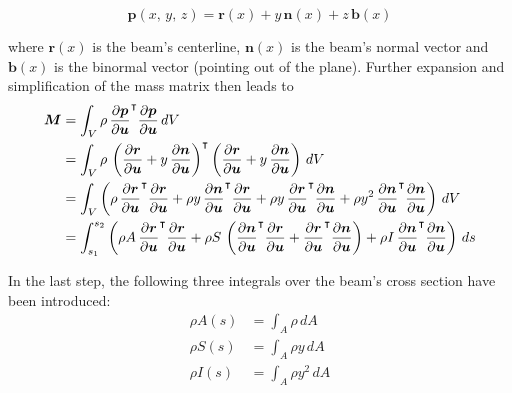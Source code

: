 \begin{equation}
\boldsymbol{p}(x,\,y,\,z) = \boldsymbol{r}(x) + y\,\boldsymbol{n}(x) + z\,\boldsymbol{b}(x)
\end{equation}

where $\boldsymbol{r}(x)$ is the beam's centerline, $\boldsymbol{n}(x)$ is the beam's normal vector and $\boldsymbol{b}(x)$ is the binormal vector (pointing out of the plane).
Further expansion and simplification of the mass matrix then leads to
%
\begin{align}
\boldsymbol{M} &= \int_{V} \rho\,\frac{\partial\boldsymbol{p}}{\partial\boldsymbol{u}}^\intercal\frac{\partial\boldsymbol{p}}{\partial\boldsymbol{u}}\,dV \notag \\
&= \int_{V} \rho\,\left(\frac{\partial\boldsymbol{r}}{\partial\boldsymbol{u}} + y\,\frac{\partial\boldsymbol{n}}{\partial\boldsymbol{u}}\right)^\intercal\left(\frac{\partial\boldsymbol{r}}{\partial\boldsymbol{u}} + y\,\frac{\partial\boldsymbol{n}}{\partial\boldsymbol{u}}\right)\,dV \notag \\
&= \int_{V} \left(\rho\,\frac{\partial\boldsymbol{r}}{\partial\boldsymbol{u}}^\intercal\frac{\partial\boldsymbol{r}}{\partial\boldsymbol{u}} + \rho y\,\frac{\partial\boldsymbol{n}}{\partial\boldsymbol{u}}^\intercal\frac{\partial\boldsymbol{r}}{\partial\boldsymbol{u}} + \rho y\,\frac{\partial\boldsymbol{r}}{\partial\boldsymbol{u}}^\intercal\frac{\partial\boldsymbol{n}}{\partial\boldsymbol{u}} + \rho y^2\,\frac{\partial\boldsymbol{n}}{\partial\boldsymbol{u}}^\intercal\frac{\partial\boldsymbol{n}}{\partial\boldsymbol{u}}\right)\,dV \notag \\
&= \int_{s_1}^{s_2} \left(\rho A\,\frac{\partial\boldsymbol{r}}{\partial\boldsymbol{u}}^\intercal\frac{\partial\boldsymbol{r}}{\partial\boldsymbol{u}} + \rho S\,\left(\frac{\partial\boldsymbol{n}}{\partial\boldsymbol{u}}^\intercal\frac{\partial\boldsymbol{r}}{\partial\boldsymbol{u}} + \frac{\partial\boldsymbol{r}}{\partial\boldsymbol{u}}^\intercal\frac{\partial\boldsymbol{n}}{\partial\boldsymbol{u}}\right) + \rho I\,\frac{\partial\boldsymbol{n}}{\partial\boldsymbol{u}}^\intercal\frac{\partial\boldsymbol{n}}{\partial\boldsymbol{u}}\right)\,ds
\end{align}

In the last step, the following three integrals over the beam's cross section have been introduced:
%
\begin{align}
\rho A(s) &= \int_A \rho\,dA \\
\rho S(s) &= \int_A \rho y\,dA \\
\rho I(s) &= \int_A \rho y^2\,dA
\end{align}

